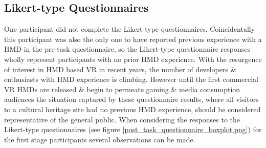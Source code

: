 \subsection{Likert-type Questionnaires}

One participant did not complete the Likert-type questionnaires. Coincidentally this participant was also the only one to have reported previous experience with a HMD in the pre-task questionnaire, so the Likert-type questionnaire responses wholly represent participants with no prior HMD experience. With the resurgence of interest in HMD based VR in recent years, the number of developers \& enthusiasts with HMD experience is climbing. However until the first commercial VR HMDs are released \& begin to permeate gaming \& media consumption audiences the situation captured by these questionnaire results, where all visitors to a cultural heritage site had no previous HMD experience, should be considered representative of the general public. When considering the responses to the Likert-type questionnaires (see figure \ref{post_task_questionnaire_boxplot.png}) for the first stage participants several observations can be made.

